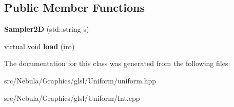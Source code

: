 \subsection*{\-Public \-Member \-Functions}
\begin{DoxyCompactItemize}
\item 
\hypertarget{classNeb_1_1glsl_1_1Uniform_1_1Scalar_1_1Sampler2D_a91f35bdd1915418833da9db087bf8689}{{\bfseries \-Sampler2\-D} (std\-::string s)}\label{classNeb_1_1glsl_1_1Uniform_1_1Scalar_1_1Sampler2D_a91f35bdd1915418833da9db087bf8689}

\item 
\hypertarget{classNeb_1_1glsl_1_1Uniform_1_1Scalar_1_1Sampler2D_ac3fc3a3d42b754e6d6a7477e8605a30d}{virtual void {\bfseries load} (int)}\label{classNeb_1_1glsl_1_1Uniform_1_1Scalar_1_1Sampler2D_ac3fc3a3d42b754e6d6a7477e8605a30d}

\end{DoxyCompactItemize}


\-The documentation for this class was generated from the following files\-:\begin{DoxyCompactItemize}
\item 
src/\-Nebula/\-Graphics/glsl/\-Uniform/uniform.\-hpp\item 
src/\-Nebula/\-Graphics/glsl/\-Uniform/\-Int.\-cpp\end{DoxyCompactItemize}
